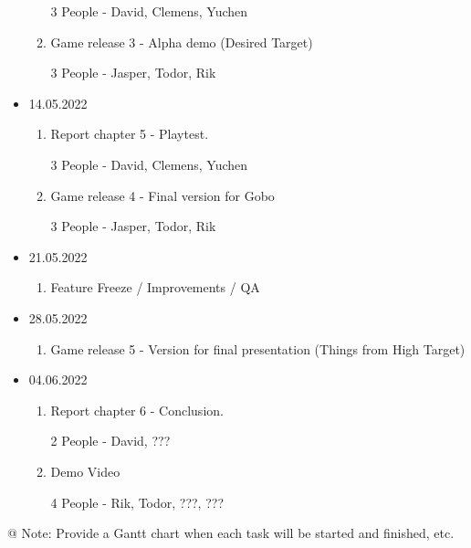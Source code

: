 \begin{itemize}
\begin{enumerate}
        3 People - David, Clemens, Yuchen
        \item Game release 3 - Alpha demo (Desired Target)
        
        3 People - Jasper, Todor, Rik
    \end{enumerate}
    
   
    
    \item 14.05.2022
    \begin{enumerate}
        \item Report chapter 5 - Playtest.
        
        3 People - David, Clemens, Yuchen
        \item Game release 4 - Final version for Gobo
        
        3 People - Jasper, Todor, Rik
    \end{enumerate}
    
    \item 21.05.2022
    \begin{enumerate}
        \item Feature Freeze / Improvements / QA
    \end{enumerate}
    
    \item 28.05.2022
    \begin{enumerate}
        \item Game release 5 - Version for final presentation (Things from High Target)
    \end{enumerate}
    
    \item 04.06.2022
    \begin{enumerate}
        \item Report chapter 6 - Conclusion.
        
        2 People - David, ???
        \item Demo Video
        
        4 People - Rik, Todor, ???, ???
    \end{enumerate}
    
    
    
\end{itemize}

\begin{TempText}
	@ Note: Provide a Gantt chart when each task will be started and finished, etc.
\end{TempText}

